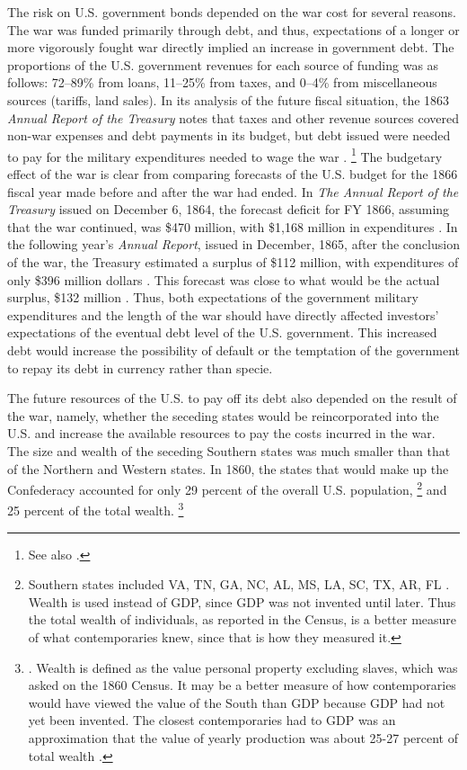 The risk on U.S. government bonds depended on the war cost for several reasons.
The  war was funded primarily through debt, and thus, expectations of a longer or more vigorously fought war directly implied an increase in government debt.
The proportions of the U.S. government revenues for each source of funding was as follows: 72--89\% from loans, 11--25\% from taxes, and 0--4\% from miscellaneous sources (tariffs, land sales).
In its analysis of the future fiscal situation, the 1863 \textit{Annual Report of the Treasury} notes that taxes and other revenue sources covered non-war expenses and debt payments in its budget, but debt issued were needed to pay for the military expenditures needed to wage the war \parencite[10-13]{Treasury1863}.
\footnote{See also \textcite[][14]{Godfrey1976}.}
The budgetary effect of the war is clear from  comparing forecasts of the U.S. budget for the 1866 fiscal year made before and after the war had ended.
In \textit{The Annual Report of the  Treasury} issued on December 6, 1864, the forecast deficit for FY 1866, assuming that the war continued, was \$470 million, with \$1,168 million in expenditures \parencite[13]{Treasury1864}.
In the following year's \textit{Annual Report}, issued in December, 1865, after the conclusion of the war, the Treasury estimated a surplus of \$112 million, with expenditures of only \$396 million dollars \parencite{Treasury1865}.
This forecast was close to what would be the actual surplus, \$132 million \parencite[2]{Treasury1866}.
Thus, both expectations of the government military expenditures and the length of the war should have directly affected investors' expectations of the eventual debt level of the U.S. government.
This increased debt would increase the possibility of default or the temptation of the government to repay its debt in currency rather than specie.

The future resources of the U.S. to pay off its debt also depended on the result of the war, namely, whether the seceding states would be reincorporated into the U.S. and increase the available resources to pay the  costs incurred in the war.
The size and wealth of the seceding Southern states was much smaller than that of the Northern and Western states.
In 1860, the states that would make up the Confederacy accounted for only 29 percent of the overall U.S. population,%
\footnote{
  Southern states included VA, TN, GA, NC, AL, MS, LA, SC, TX, AR, FL \textcite[5]{Eicher2001}.
  Wealth is used instead of GDP, since GDP was not invented until later.
  Thus the total wealth of individuals, as reported in the Census, is a better measure of what contemporaries knew, since that is how they measured it.
}
and 25 percent of the total wealth.%
\footnote{
  \textcite[12]{Elder1865}. Wealth is defined as the value personal property excluding slaves, which was asked on the 1860 Census.
  It may be a better measure of how contemporaries would have viewed the value of the South than GDP because GDP had not yet been invented.
  The closest contemporaries had to GDP was an approximation that the value of yearly production was about 25-27 percent of total wealth \parencites[7]{Elder1865}[24]{Treasury1865}.
}

